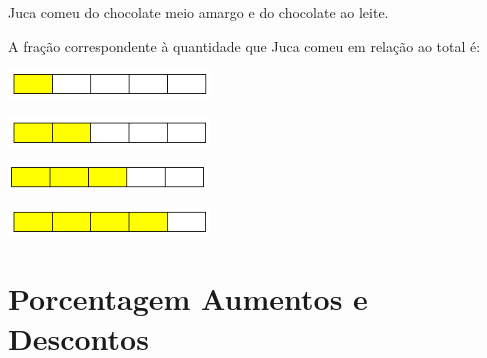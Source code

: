\begin{escolha}
\begin{boxmedio}
\begin{boxmedio}
{\begin{boxpeq}
\begin{boxpeq}
{Juca comeu  do chocolate meio amargo e  do
chocolate ao leite.

A fração correspondente à quantidade que Juca comeu em relação ao total
é:

\begin{escolha}

\item
  \includegraphics[width=2.11685in,height=0.29169in]{./_SAEB_9_MAT/media/image54.png}
\item
  \includegraphics[width=2.10852in,height=0.30003in]{./_SAEB_9_MAT/media/image55.png}
\item
  \includegraphics[width=2.08351in,height=0.25002in]{./_SAEB_9_MAT/media/image56.png}
\item
  \includegraphics[width=2.10852in,height=0.30003in]{./_SAEB_9_MAT/media/image57.png}
\end{escolha}



\chapter{Porcentagem Aumentos e Descontos}

}
\end{boxpeq}
\end{boxpeq}}
\end{boxmedio}
\end{boxmedio}
\end{escolha}
